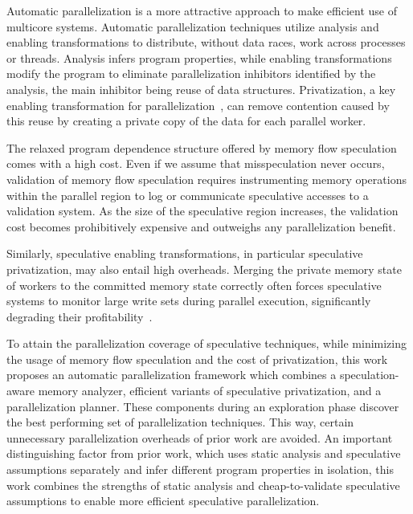 Automatic parallelization is a more attractive approach to make
efficient use of multicore systems.
%
Automatic parallelization techniques utilize analysis and enabling
transformations to distribute, without data races, work across
processes or threads.
%
Analysis infers program properties, while enabling transformations
modify the program to eliminate parallelization inhibitors identified
by the analysis, the main inhibitor being reuse of data structures.
Privatization, a key enabling transformation for
parallelization~\cite{citations_from_privateer}, can remove contention
caused by this reuse by creating a private copy of the data for each parallel
worker.


%

The relaxed program dependence structure offered by memory flow
speculation comes with a high cost.  Even if we assume that
misspeculation never occurs, validation of memory flow speculation
requires instrumenting memory operations within the parallel region to
log or communicate speculative accesses to a validation system. As the
size of the speculative region increases, the validation cost becomes
prohibitively expensive and outweighs any parallelization benefit.

Similarly, speculative enabling transformations,
in particular speculative privatization, may also entail high
overheads.  Merging the private memory state of workers to the
committed memory state correctly often forces speculative systems to monitor
large write sets during parallel execution, significantly degrading
their profitability~\cite{kim:12:cgo,johnson:12:pldi}.

To attain the parallelization coverage of speculative techniques,
while minimizing the usage of memory flow speculation and the cost of
privatization,
%
this work proposes an automatic parallelization framework which
combines a speculation-aware memory analyzer, efficient variants of
speculative privatization, and a parallelization planner. These
components during an exploration phase discover the best performing
set of parallelization techniques. This way, certain unnecessary
parallelization overheads of prior work are avoided.
%
An important distinguishing factor from prior work, which uses static
analysis and speculative assumptions separately and infer
different program properties in isolation, this work combines
the strengths of static analysis and cheap-to-validate speculative
assumptions to enable more efficient speculative parallelization.

